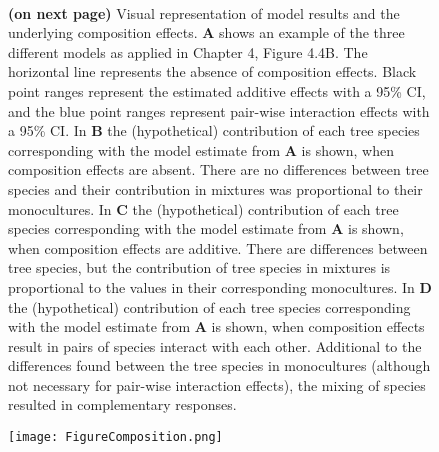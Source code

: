\documentclass[b5paper,10pt]{book} %
\begin{document}
	\begin{figure}[bh!]
			\begin{caption} \\ \textbf{(on next page)} Visual representation of model results and the underlying composition effects. \textbf{A} shows an example of the three different models as applied in Chapter 4, Figure 4.4B. The horizontal line represents the absence of composition effects. Black point ranges represent the estimated additive effects with a 95\% CI, and the blue point ranges represent pair-wise interaction effects with a 95\% CI. In \textbf{B} the (hypothetical) contribution of each tree species corresponding with the model estimate from \textbf{A} is shown, when composition effects are absent. There are no differences between tree species and their contribution in mixtures was proportional to their monocultures. In \textbf{C} the (hypothetical) contribution of each tree species corresponding with the model estimate from \textbf{A} is shown, when composition effects are additive. There are differences between tree species, but the contribution of tree species in mixtures is proportional to the values in their corresponding monocultures. In \textbf{D} the (hypothetical) contribution of each tree species corresponding with the model estimate from \textbf{A} is shown, when composition effects result in pairs of species interact with each other. Additional to the differences found between the tree species in monocultures (although not necessary for pair-wise interaction effects), the mixing of species resulted in complementary responses.  \label{FigA.1} \end{caption}
\end{figure}
\begin{figure}
			\texttt{[image: FigureComposition.png]}
	\end{figure}
	
\end{document}
